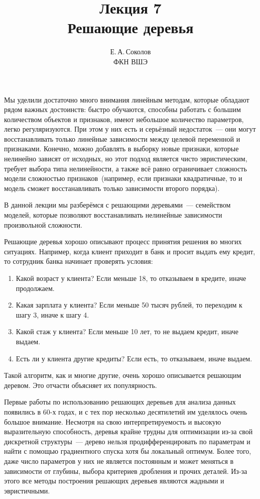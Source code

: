\documentclass[12pt,fleqn]{article}
\begin{document}
\title{Лекция 7\\Решающие деревья}
\author{Е.\,А.\,Соколов\\ФКН ВШЭ}
\maketitle

Мы уделили достаточно много внимания линейным методам, которые обладают рядом важных достоинств:
быстро обучаются, способны работать с большим количеством объектов и признаков,
имеют небольшое количество параметров, легко регуляризуются.
При этом у них есть и серьёзный недостаток~--- они могут восстанавливать только
линейные зависимости между целевой переменной и признаками.
Конечно, можно добавлять в выборку новые признаки, которые нелинейно зависят от исходных,
но этот подход является чисто эвристическим, требует выбора типа нелинейности,
а также всё равно ограничивает сложность модели сложностью признаков~(например,
если признаки квадратичные, то и модель сможет восстанавливать только зависимости второго порядка).

В данной лекции мы разберёмся с решающими деревьями~--- семейством моделей, которые позволяют восстанавливать нелинейные зависимости
произвольной сложности.

Решающие деревья хорошо описывают процесс принятия решения во многих ситуациях.
Например, когда клиент приходит в банк и просит выдать ему кредит, то сотрудник банка
начинает проверять условия:
\begin{enumerate}
    \item Какой возраст у клиента? Если меньше 18, то отказываем в кредите, иначе продолжаем.
    \item Какая зарплата у клиента? Если меньше 50 тысяч рублей, то переходим к шагу 3, иначе к шагу 4.
    \item Какой стаж у клиента? Если меньше 10 лет, то не выдаем кредит, иначе выдаем.
    \item Есть ли у клиента другие кредиты? Если есть, то отказываем, иначе выдаем.
\end{enumerate}
Такой алгоритм, как и многие другие, очень хорошо описывается решающим деревом.
Это отчасти объясняет их популярность.

Первые работы по использованию решающих деревьев для анализа данных появились в 60-х годах,
и с тех пор несколько десятилетий им уделялось очень большое внимание.
Несмотря на свою интерпретируемость и высокую выразительную способность,
деревья крайне трудны для оптимизации из-за свой дискретной структуры~---
дерево нельзя продифференцировать по параметрам и найти с помощью градиентного спуска
хотя бы локальный оптимум.
Более того, даже число параметров у них не является постоянным и может меняться в зависимости
от глубины, выбора критериев дробления и прочих деталей.
Из-за этого все методы построения решающих деревьев являются жадными и эвристичными.
\end{document}
